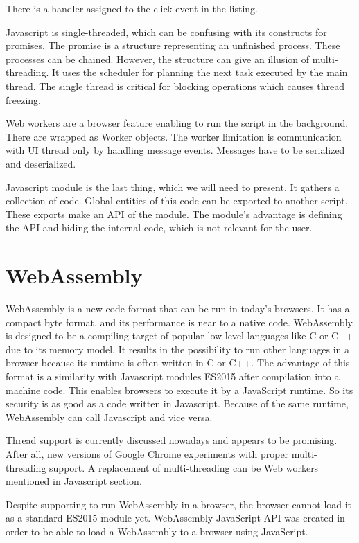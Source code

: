 There is a handler assigned to the click event in the listing.
\par
{}
Javascript is single-threaded, which can be confusing with its constructs for promises.
The promise is a structure representing an unfinished process.
These processes can be chained.
However, the structure can give an illusion of multi-threading. It uses the scheduler for planning the next task executed by the main thread.
The single thread is critical for blocking operations which causes thread freezing.
\par
Web workers  are a browser feature enabling to run the script in the background.
There are wrapped as Worker objects.
The worker limitation is communication with UI thread only by handling message events. 
Messages have to be serialized and deserialized.
\par
{}
Javascript module is the last thing, which we will need to present.
It gathers a collection of code.
Global entities of this code can be exported to another script.
These exports make an API of the module.
The module's advantage is defining the API and hiding the internal code, which is not relevant for the user.
\section{WebAssembly}

WebAssembly  is a new code format that can be run in today's browsers. 
It has a compact byte format, and its performance is near to a native code. 
WebAssembly is designed to be a compiling target of popular low-level languages like C or C++ due to its memory model.
It results in the possibility to run other languages in a browser because its runtime is often written in C or C++. 
The advantage of this format is a similarity with Javascript modules ES2015 after compilation into a machine code. 
This enables browsers to execute it by a JavaScript runtime. 
So its security is as good as a code written in Javascript. 
Because of the same runtime, WebAssembly can call Javascript and vice versa.
\par
{}
Thread  support is currently discussed nowadays and appears to be promising.
After all, new versions of Google Chrome experiments with proper multi-threading support.
A replacement of multi-threading can be Web workers mentioned in Javascript section.
\par
Despite supporting to run WebAssembly in a browser, the browser cannot load it as a standard ES2015 module yet.
WebAssembly JavaScript API was created in order to be able to load a WebAssembly to a browser using JavaScript.

